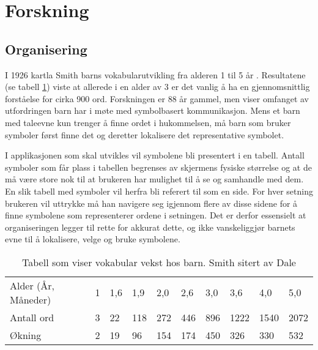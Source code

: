 \section{Forskning}


\subsection{Organisering}


I 1926 kartla Smith\cite{Smith} barns vokabularutvikling fra alderen 1 til 5 år . Resultatene (se tabell \ref{fig:BarnVak}) viste at allerede i en alder av 3 er det vanlig å ha en gjennomsnittlig forståelse for cirka 900 ord. Forskningen er 88 år gammel, men viser omfanget av utfordringen barn har i møte med symbolbasert kommunikasjon. Mens et barn med taleevne kun trenger å finne ordet i hukommelsen, må barn som bruker symboler først finne det og deretter lokalisere det representative symbolet. 

I applikasjonen som skal utvikles vil symbolene bli presentert i en tabell. Antall symboler som får plass i tabellen begrenses av skjermens fysiske størrelse og at de må være store nok til at brukeren har mulighet til å se  og samhandle med dem. En slik tabell med symboler vil herfra bli referert til som en side. For hver setning brukeren vil uttrykke må han navigere seg igjennom flere av disse sidene for å finne symbolene som representerer ordene i setningen. Det er derfor essensielt at organiseringen legger til rette for akkurat dette, og ikke vanskeliggjør barnets evne til å lokalisere, velge og bruke symbolene.

\begin{table}[h]
\begin{tabular}{llllllllll}
\hline
Alder (År, Måneder) & 1 & 1,6 & 1,9 & 2,0 & 2,6 & 3,0 & 3,6  & 4,0  & 5,0  \\ 
Antall ord          & 3 & 22  & 118 & 272 & 446 & 896 & 1222 & 1540 & 2072 \\ 
Økning              & 2 & 19  & 96  & 154 & 174 & 450 & 326  & 330  & 532  \\ \hline
\end{tabular}
\caption{Tabell som viser vokabular vekst hos barn.  Smith \cite{Smith} sitert av Dale \cite{Dale} }
\label{fig:BarnVak}
\end{table}



